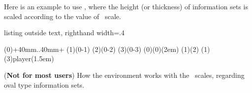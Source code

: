 Here is an example to use \xw{[scale=.5,xscale=1]}, where the height (or thickness) of information sets is scaled according to the value of \TikZ\ scale.

\begin{tcblisting}{listing outside text, righthand width=.4\linewidth}
\begin{istgame}[scale=.5,xscale=1]
\xtdistance{40mm}{30mm}
\istroot(0)+40mm..40mm+
            \istb \istb \istb \endist
\istroot(1)(0-1)  \istb \istb \endist
\istroot(2)(0-2)  \istb \istb \endist
\istroot(3)(0-3)  \istb \istb \endist
\xtInfosetO(0)(0)(2em)
\xtInfosetO[fill=green](1)(2)
\xtCInfosetO(1)(3){player}(1.5em)
\end{istgame}
\end{tcblisting}


\remark (\textbf{Not for most users})
How the  environment works with the \Tikz\ scales, regarding oval type information sets.
